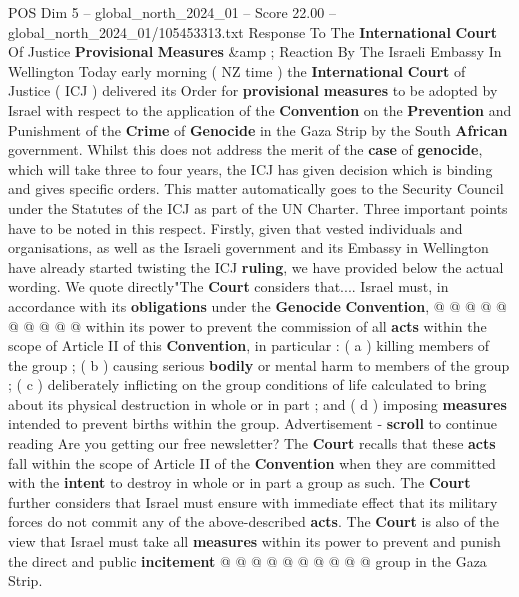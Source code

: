 \begin{textsample}{POS Dim 5 – global\_north\_2024\_01 – Score 22.00 – global\_north\_2024\_01/105453313.txt}  \label{ex:f5_pos_112}
Response To The \textbf{International} \textbf{Court} Of Justice \textbf{Provisional} \textbf{Measures} \&amp ; Reaction By The Israeli Embassy In Wellington Today early morning ( NZ time ) the \textbf{International} \textbf{Court} of Justice ( ICJ ) delivered its Order for \textbf{provisional} \textbf{measures} to be adopted by Israel with respect to the application of the \textbf{Convention} on the \textbf{Prevention} and Punishment of the \textbf{Crime} of \textbf{Genocide} in the Gaza Strip by the South \textbf{African} government.
Whilst this does not address the merit of the \textbf{case} of \textbf{genocide}, which will take three to four years, the ICJ has given decision which is binding and gives specific orders.
This matter automatically goes to the Security Council under the Statutes of the ICJ as part of the UN Charter.
Three important points have to be noted in this respect.
Firstly, given that vested individuals and organisations, as well as the Israeli government and its Embassy in Wellington have already started twisting the ICJ \textbf{ruling}, we have provided below the actual wording.
We quote directly"The \textbf{Court} considers that....
Israel must, in accordance with its \textbf{obligations} under the \textbf{Genocide} \textbf{Convention}, @ @ @ @ @ @ @ @ @ @ within its power to prevent the commission of all \textbf{acts} within the scope of Article II of this \textbf{Convention}, in particular : ( a ) killing members of the group ; ( b ) causing serious \textbf{bodily} or mental harm to members of the group ; ( c ) deliberately inflicting on the group conditions of life calculated to bring about its physical destruction in whole or in part ; and ( d ) imposing \textbf{measures} intended to prevent births within the group.
Advertisement - \textbf{scroll} to continue reading Are you getting our free newsletter?
The \textbf{Court} recalls that these \textbf{acts} fall within the scope of Article II of the \textbf{Convention} when they are committed with the \textbf{intent} to destroy in whole or in part a group as such.
The \textbf{Court} further considers that Israel must ensure with immediate effect that its military forces do not commit any of the above-described \textbf{acts}.
The \textbf{Court} is also of the view that Israel must take all \textbf{measures} within its power to prevent and punish the direct and public \textbf{incitement} @ @ @ @ @ @ @ @ @ @ group in the Gaza Strip.

\end{textsample}

